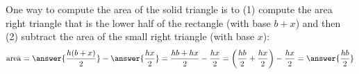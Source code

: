 \documentclass[nooutcomes,space,handout]{ximera}
\begin{document}
\begin{problem}
\begin{problem}
One way to compute the area of the solid triangle is to (1) compute the area right triangle that is the lower half of the rectangle (with base $b+x$) and then (2) subtract the area of the small right triangle (with base $x$): 
\[
\mathrm{area} =  \answer{\frac{h(b+x)}{2}} - \answer{\frac{hx}{2}}= \frac{hb+hx}{2} - \frac{hx}{2}
= \left(\frac{hb}{2} + \frac{hx}{2}\right) - \frac{hx}{2} = \answer{\frac{hb}{2}}
\]
\end{problem}
\end{problem}
\end{document}
